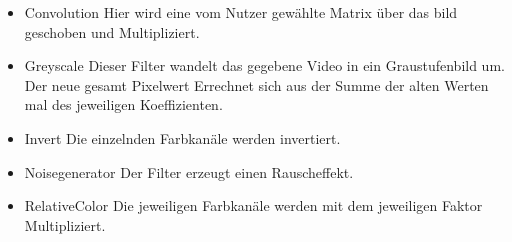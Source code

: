 \begin{itemize}
\item Convolution \newline
Hier wird eine vom Nutzer gewählte Matrix über das bild geschoben und Multipliziert.
\item Greyscale \newline
Dieser Filter wandelt das gegebene Video in ein Graustufenbild um. 
Der neue gesamt Pixelwert Errechnet sich aus  der Summe der alten Werten mal des jeweiligen Koeffizienten.
\item Invert \newline
Die einzelnden Farbkanäle werden invertiert.
\item Noisegenerator \newline
Der Filter erzeugt einen Rauscheffekt.
\item RelativeColor \newline
Die jeweiligen Farbkanäle werden mit dem jeweiligen Faktor Multipliziert.

\end{itemize}


